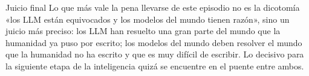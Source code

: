 \documentclass[a4paper]{article}
\begin{document}
\begin{importantbox}{Juicio final}
Lo que más vale la pena llevarse de este episodio no es la dicotomía «los LLM están equivocados y los modelos del mundo tienen razón», sino un juicio más preciso: los LLM han resuelto una gran parte del mundo que la humanidad ya puso por escrito; los modelos del mundo deben resolver el mundo que la humanidad no ha escrito y que es muy difícil de escribir. Lo decisivo para la siguiente etapa de la inteligencia quizá se encuentre en el puente entre ambos.
\end{importantbox}
\end{document}
